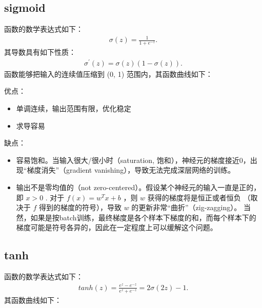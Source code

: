\documentclass[letterpaper,10pt,english]{sphinxmanual}
\let\sphinxpxdimen\pdfpxdimen\else\newdimen\sphinxpxdimen
\begin{document}
\subsection{sigmoid}
\label{\detokenize{deepLearning/02_activationFunction:sigmoid}}
 函数的数学表达式如下：
\begin{equation*}
\begin{split}\sigma(z) = \frac{1}{1 + e^{-z}}.\end{split}
\end{equation*}
其导数具有如下性质：
\begin{equation*}
\begin{split}\sigma^\prime(z) = \sigma(z)(1-\sigma(z)).\end{split}
\end{equation*}
 函数能够把输入的连续值压缩到 (0, 1) 范围内，其函数曲线如下：

\noindent{\hspace*{\fill}\sphinxincludegraphics[width=500\sphinxpxdimen]{{02_sigmoid}.jpeg}\hspace*{\fill}}

优点：
\begin{itemize}
\item {} 
单调连续，输出范围有限，优化稳定

\item {} 
求导容易

\end{itemize}

缺点：
\begin{itemize}
\item {} 
容易饱和。当输入很大/很小时（saturation, 饱和），神经元的梯度接近0，出现“梯度消失”（gradient vanishing），导致无法完成深层网络的训练。

\item {} 
输出不是零均值的（not zero-centered）。假设某个神经元的输入一直是正的，即 \(x>0\) . 对于 \(f(x)=w^Tx+b\) ，则 \(w\) 获得的梯度将是恒正或者恒负
（取决于 \(f\) 得到的梯度的符号），导致 \(w\) 的更新非常“曲折”（zig-zagging）。
当然，如果是按batch训练，最终梯度是各个样本下梯度的和，而每个样本下的梯度可能是符号各异的，因此在一定程度上可以缓解这个问题。

\end{itemize}


\subsection{tanh}
\label{\detokenize{deepLearning/02_activationFunction:tanh}}
 函数的数学表达式如下：
\begin{equation*}
\begin{split}tanh(z) = \frac{e^z-e^{-z}}{e^z+e^{-z}} = 2\sigma(2z)-1.\end{split}
\end{equation*}
其函数曲线如下：
\end{document}
